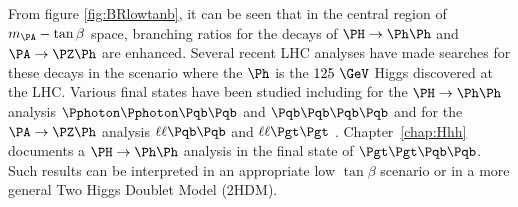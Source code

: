 From figure \ref{fig:BRlowtanb}, it can be seen that in the central region of 
$m_{\PA}-\tan\beta$ space, branching ratios for the decays of
$\PH\to\Ph\Ph$ and $\PA\to\PZ\Ph$ are enhanced. Several recent LHC analyses have
made searches for these decays in the scenario where the $\Ph$ is the $125~\GeV$
Higgs discovered at the LHC. Various final states have been studied including
for the $\PH\to\Ph\Ph$ analysis $\Pphoton\Pphoton\Pqb\Pqb$ \cite{Aad:2014yja,CMS-PAS-HIG-13-032} and 
$\Pqb\Pqb\Pqb\Pqb$ \cite{CMS-PAS-HIG-14-013} and for the $\PA\to\PZ\Ph$ analysis $\ell\ell\Pqb\Pqb$
and $\ell\ell\Pgt\Pgt$ \cite{Aad:2015wra,CMS-PAS-HIG-14-011}. 
Chapter~\ref{chap:Hhh} documents a $\PH\to\Ph\Ph$ analysis in the
final state of $\Pgt\Pgt\Pqb\Pqb$. Such results can be interpreted in an
appropriate low $\tan\beta$ scenario or in a more general Two Higgs Doublet
Model (2HDM).
 



